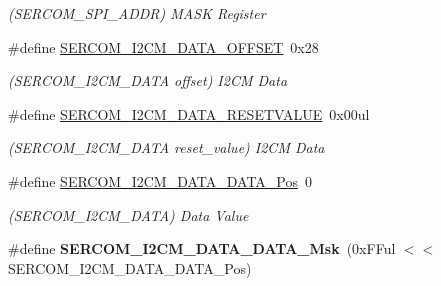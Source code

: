 \begin{DoxyCompactItemize}
\begin{DoxyCompactList}\small\item\em (S\+E\+R\+C\+O\+M\+\_\+\+S\+P\+I\+\_\+\+A\+D\+D\+R) M\+A\+S\+K Register \end{DoxyCompactList}\item 
\hypertarget{group___s_a_m_l21___s_e_r_c_o_m_gacf615e93d2fa221cbfaed4ee81d199f2}{}\#define \hyperlink{group___s_a_m_l21___s_e_r_c_o_m_gacf615e93d2fa221cbfaed4ee81d199f2}{S\+E\+R\+C\+O\+M\+\_\+\+I2\+C\+M\+\_\+\+D\+A\+T\+A\+\_\+\+O\+F\+F\+S\+E\+T}~0x28\label{group___s_a_m_l21___s_e_r_c_o_m_gacf615e93d2fa221cbfaed4ee81d199f2}

\begin{DoxyCompactList}\small\item\em (S\+E\+R\+C\+O\+M\+\_\+\+I2\+C\+M\+\_\+\+D\+A\+T\+A offset) I2\+C\+M Data \end{DoxyCompactList}\item 
\hypertarget{group___s_a_m_l21___s_e_r_c_o_m_gab8a1b1af7cbed3c0dc5c7b0c5231916d}{}\#define \hyperlink{group___s_a_m_l21___s_e_r_c_o_m_gab8a1b1af7cbed3c0dc5c7b0c5231916d}{S\+E\+R\+C\+O\+M\+\_\+\+I2\+C\+M\+\_\+\+D\+A\+T\+A\+\_\+\+R\+E\+S\+E\+T\+V\+A\+L\+U\+E}~0x00ul\label{group___s_a_m_l21___s_e_r_c_o_m_gab8a1b1af7cbed3c0dc5c7b0c5231916d}

\begin{DoxyCompactList}\small\item\em (S\+E\+R\+C\+O\+M\+\_\+\+I2\+C\+M\+\_\+\+D\+A\+T\+A reset\+\_\+value) I2\+C\+M Data \end{DoxyCompactList}\item 
\hypertarget{group___s_a_m_l21___s_e_r_c_o_m_ga5d492a7a17f6ef63c189c8fd0703bee4}{}\#define \hyperlink{group___s_a_m_l21___s_e_r_c_o_m_ga5d492a7a17f6ef63c189c8fd0703bee4}{S\+E\+R\+C\+O\+M\+\_\+\+I2\+C\+M\+\_\+\+D\+A\+T\+A\+\_\+\+D\+A\+T\+A\+\_\+\+Pos}~0\label{group___s_a_m_l21___s_e_r_c_o_m_ga5d492a7a17f6ef63c189c8fd0703bee4}

\begin{DoxyCompactList}\small\item\em (S\+E\+R\+C\+O\+M\+\_\+\+I2\+C\+M\+\_\+\+D\+A\+T\+A) Data Value \end{DoxyCompactList}\item 
\hypertarget{group___s_a_m_l21___s_e_r_c_o_m_gae18dae057d191410cbf2e3dfbffbc4af}{}\#define {\bfseries S\+E\+R\+C\+O\+M\+\_\+\+I2\+C\+M\+\_\+\+D\+A\+T\+A\+\_\+\+D\+A\+T\+A\+\_\+\+Msk}~(0x\+F\+Ful $<$$<$ S\+E\+R\+C\+O\+M\+\_\+\+I2\+C\+M\+\_\+\+D\+A\+T\+A\+\_\+\+D\+A\+T\+A\+\_\+\+Pos)\label{group___s_a_m_l21___s_e_r_c_o_m_gae18dae057d191410cbf2e3dfbffbc4af}


\end{DoxyCompactItemize}
